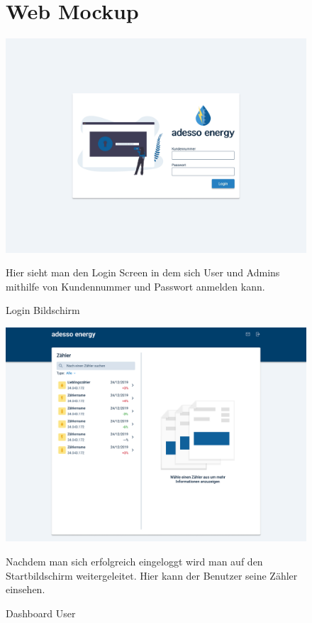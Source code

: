 
\newpage

\begin{figure}[h] 
	\newpage
	\section{Web Mockup}
	\centering
    \includegraphics[scale=0.3]{img/WebsiteMockup/Login-User}
	\caption{Login Bildschirm} \hfill \break
	Hier sieht man den Login Screen in dem sich User und Admins mithilfe von Kundennummer und Passwort anmelden kann.
\end{figure}
 
\newpage

\begin{figure}[h]
	\centering
    \includegraphics[scale=0.3]{img/WebsiteMockup/Dashboard-User-NonSelected}
	\caption{Dashboard User} \hfill \break
	Nachdem man sich erfolgreich eingeloggt wird man auf den Startbildschirm weitergeleitet. Hier kann der Benutzer seine Zähler einsehen.
\end{figure}

